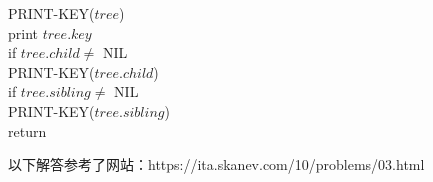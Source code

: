 \documentclass[12pt, a4paper, UTF8]{ctexart}
\begin{document}
\begin{solution}
  PRINT-KEY($tree$)\\
  \indent print $tree.key$\\
  \indent if $tree.child\neq$ NIL\\
  \indent\indent PRINT-KEY($tree.child$)\\
  \indent if $tree.sibling\neq$ NIL\\
  \indent\indent PRINT-KEY($tree.sibling$)\\
  \indent return
\end{solution}

\begin{problem}[TC: 10-3]
\end{problem}

\begin{remark}
  以下解答参考了网站：https://ita.skanev.com/10/problems/03.html
\end{remark}
\end{document}

